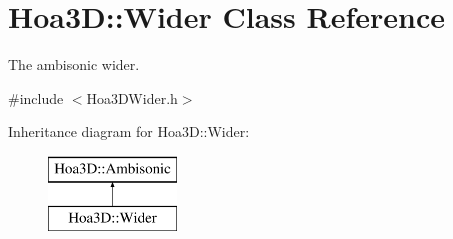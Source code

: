 \hypertarget{class_hoa3_d_1_1_wider}{\section{Hoa3\-D\-:\-:Wider Class Reference}
\label{class_hoa3_d_1_1_wider}
}


The ambisonic wider.  




{\ttfamily \#include $<$Hoa3\-D\-Wider.\-h$>$}

Inheritance diagram for Hoa3\-D\-:\-:Wider\-:\begin{figure}[H]
\begin{center}
\leavevmode
\includegraphics[height=2.000000cm]{class_hoa3_d_1_1_wider}
\end{center}
\end{figure}
